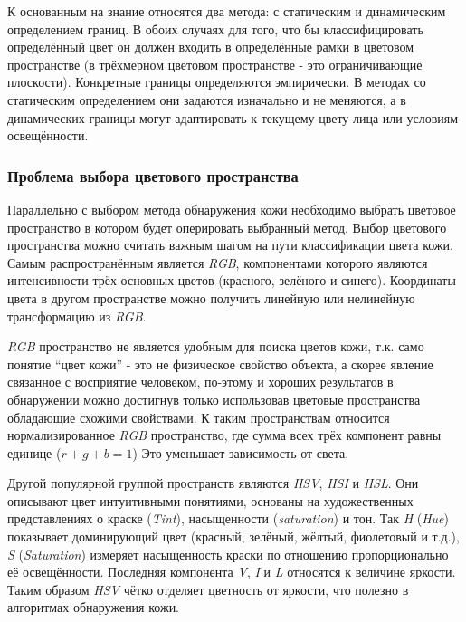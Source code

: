 \documentclass[12pt]{report}
\begin{document}
К основанным на знание относятся два метода: с статическим и динамическим определением границ. В обоих случаях для 
того, что бы классифицировать определённый цвет он должен входить в определённые рамки в цветовом пространстве (в 
трёхмерном цветовом пространстве - это ограничивающие плоскости). Конкретные границы определяются эмпирически. В 
методах со статическим определением они задаются изначально и не меняются, а в динамических границы могут 
адаптировать к текущему цвету лица или условиям освещённости. 

\subsubsection{Проблема выбора цветового пространства}
Параллельно с выбором метода обнаружения кожи необходимо выбрать цветовое пространство в котором будет оперировать 
выбранный метод. Выбор цветового пространства можно считать важным шагом на пути классификации цвета кожи. Самым 
распространённым является \textit{RGB}, компонентами которого являются интенсивности трёх основных цветов (красного, 
зелёного и синего). Координаты цвета в другом пространстве можно получить линейную или нелинейную трансформацию из 
\textit{RGB}. \cite{kakumanu2007survey} 

\textit{RGB} пространство не является удобным для поиска цветов кожи, т.к. само понятие ``цвет кожи'' - это не 
физическое свойство объекта, а скорее явление связанное с восприятие человеком, по-этому и хороших результатов в 
обнаружении можно достигнув только использовав цветовые пространства обладающие схожими свойствами. К таким 
пространствам относится нормализированное \textit{RGB} пространство, где сумма всех трёх компонент равны единице ($r
+g+b=1$) Это уменьшает зависимость от света. \citep{vezhnevets2003survey}

Другой популярной группой пространств являются \textit{HSV}, \textit{HSI} и \textit{HSL}. Они описывают цвет 
интуитивными понятиями, основаны на художественных представлениях о краске (\textit{Tint}), насыщенности (\textit
{saturation}) и тон. Так \textit{H} (\textit{Hue}) показывает доминирующий цвет (красный, зелёный, жёлтый, фиолетовый 
и т.д.), \textit{S} (\textit{Saturation}) измеряет насыщенность краски по отношению пропорционально её освещённости. 
Последняя компонента \textit{V}, \textit{I} и \textit{L} относятся к величине яркости. Таким образом \textit{HSV} 
чётко отделяет цветность от яркости, что полезно в алгоритмах обнаружения кожи. \citep{vezhnevets2003survey}
\end{document}

